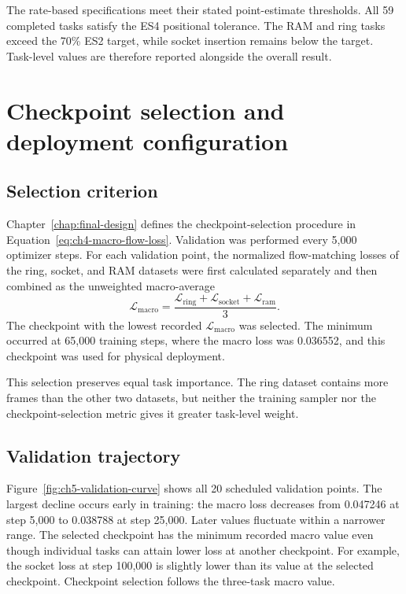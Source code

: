 The rate-based specifications meet their stated point-estimate thresholds. All
59 completed tasks satisfy the ES4 positional tolerance. The RAM and ring tasks
exceed the 70\% ES2 target, while socket insertion remains below the target.
Task-level values are therefore reported alongside the overall result.

\section{Checkpoint selection and deployment configuration}

\subsection{Selection criterion}

Chapter~\ref{chap:final-design} defines the checkpoint-selection procedure in Equation~\ref{eq:ch4-macro-flow-loss}. Validation was performed every 5,000 optimizer steps. For each validation point, the normalized flow-matching losses of the ring, socket, and RAM datasets were first calculated separately and then combined as the unweighted macro-average
\[
\mathcal L_{\mathrm{macro}}
=
\frac{
\mathcal L_{\mathrm{ring}}
+
\mathcal L_{\mathrm{socket}}
+
\mathcal L_{\mathrm{ram}}
}{3}.
\]
The checkpoint with the lowest recorded $\mathcal L_{\mathrm{macro}}$ was selected. The minimum occurred at 65,000 training steps, where the macro loss was 0.036552, and this checkpoint was used for physical deployment.

This selection preserves equal task importance. The ring dataset contains more frames than the other two datasets, but neither the training sampler nor the checkpoint-selection metric gives it greater task-level weight.

\subsection{Validation trajectory}

Figure~\ref{fig:ch5-validation-curve} shows all 20 scheduled validation points.
The largest decline occurs early in training: the macro loss decreases from
0.047246 at step 5,000 to 0.038788 at step 25,000. Later values fluctuate
within a narrower range. The selected checkpoint has the minimum recorded macro value even
though individual tasks can attain lower loss at another checkpoint. For
example, the socket loss at step 100,000 is slightly lower than its value at
the selected checkpoint. Checkpoint selection follows the three-task macro value.

